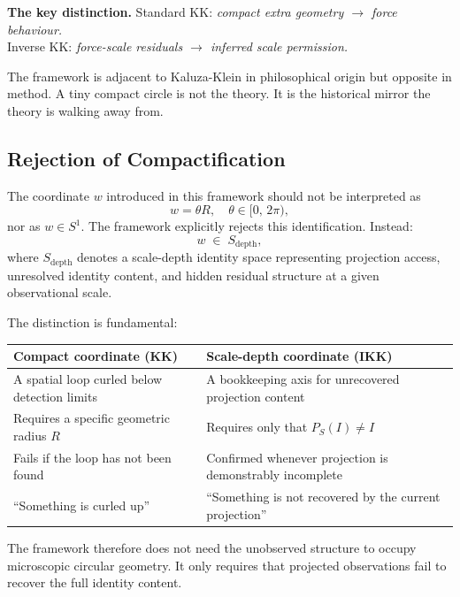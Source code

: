 \documentclass[11pt,a4paper]{article}
\begin{document}
\begin{keybox}
\textbf{The key distinction.}\quad
Standard KK: \emph{compact extra geometry $\to$ force behaviour.}\\
Inverse KK: \emph{force-scale residuals $\to$ inferred scale permission.}

The framework is adjacent to Kaluza-Klein in philosophical origin but opposite
in method.  A tiny compact circle is not the theory.  It is the historical
mirror the theory is walking away from.
\end{keybox}

\subsection{Rejection of Compactification}
\label{sec:nocompact}

The coordinate $w$ introduced in this framework should not be interpreted as
\[
  w = \theta R ,\quad \theta \in [0,\,2\pi) ,
\]
nor as $w \in S^1$.  The framework explicitly rejects this identification.
Instead:
\[
  w \;\in\; S_{\text{depth}} ,
\]
where $S_{\text{depth}}$ denotes a scale-depth identity space representing
projection access, unresolved identity content, and hidden residual structure
at a given observational scale.

The distinction is fundamental:

\medskip
\begin{center}
\begin{tabular}{@{}p{}p{}@{}}
\toprule
\textbf{Compact coordinate} (KK) & \textbf{Scale-depth coordinate} (IKK) \\
\midrule
A spatial loop curled below detection limits &
A bookkeeping axis for unrecovered projection content \\[6pt]
Requires a specific geometric radius $R$ &
Requires only that $P_S(I) \neq I$ \\[6pt]
Fails if the loop has not been found &
Confirmed whenever projection is demonstrably incomplete \\[6pt]
``Something is curled up'' &
``Something is not recovered by the current projection'' \\
\bottomrule
\end{tabular}
\end{center}

\medskip\noindent
The framework therefore does not need the unobserved structure to occupy
microscopic circular geometry.  It only requires that projected observations
fail to recover the full identity content.
\end{document}
